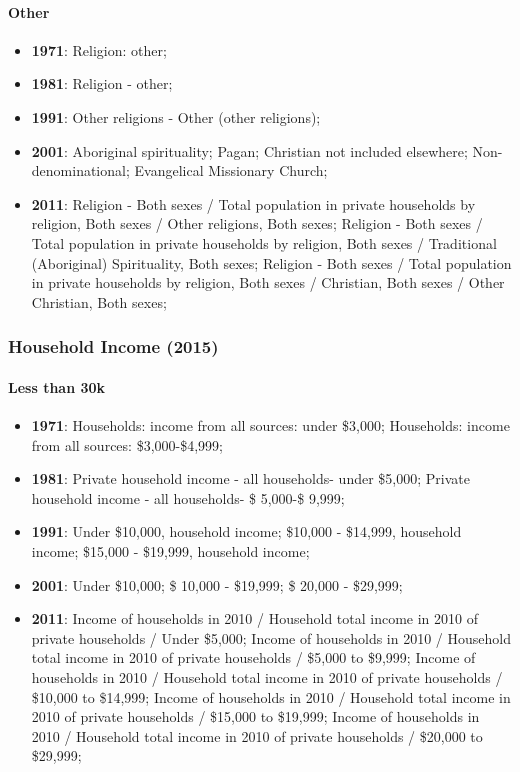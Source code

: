 \documentclass[a4paper]{article}
\begin{document}
\paragraph{Other}
\begin{itemize}
   \item{\textbf{1971}:  Religion: other;}
   \item{\textbf{1981}:  Religion - other;}
   \item{\textbf{1991}:  Other religions - Other (other religions);}
   \item{\textbf{2001}:  Aboriginal spirituality; Pagan; Christian not included elsewhere; Non-denominational; Evangelical Missionary Church;}
   \item{\textbf{2011}:  Religion - Both sexes / Total population in private households by religion, Both sexes / Other religions, Both sexes; Religion - Both sexes / Total population in private households by religion, Both sexes / Traditional (Aboriginal) Spirituality, Both sexes; Religion - Both sexes / Total population in private households by religion, Both sexes / Christian, Both sexes / Other Christian, Both sexes;}
\end{itemize}

\subsubsection{Household Income (2015)}
\paragraph{Less than 30k}
\begin{itemize}
   \item{\textbf{1971}:  Households: income from all sources: under \$3,000; Households: income from all sources: \$3,000-\$4,999;}
   \item{\textbf{1981}:  Private household income - all households- under \$5,000; Private household income - all households- \$ 5,000-\$ 9,999;}
   \item{\textbf{1991}:  Under \$10,000, household income; \$10,000 - \$14,999, household income; \$15,000 - \$19,999, household income;}
   \item{\textbf{2001}:  Under \$10,000; \$ 10,000 - \$19,999; \$ 20,000 - \$29,999;}
   \item{\textbf{2011}:  Income of households in 2010 / Household total income in 2010 of private households / Under \$5,000; Income of households in 2010 / Household total income in 2010 of private households / \$5,000 to \$9,999; Income of households in 2010 / Household total income in 2010 of private households / \$10,000 to \$14,999; Income of households in 2010 / Household total income in 2010 of private households / \$15,000 to \$19,999; Income of households in 2010 / Household total income in 2010 of private households / \$20,000 to \$29,999;}
\end{itemize}
\end{document}
